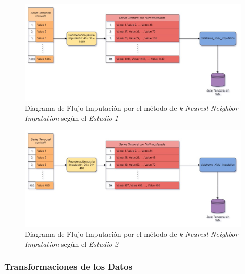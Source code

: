 \newpage
\thispagestyle{empty}
\begin{landscape}
    \begin{figure}[H]
        \centering
        \includegraphics[scale = 0.5]{./img/knn-diagram-e1.jpg}
        \caption{Diagrama de Flujo Imputación por el método de \textit{k-Nearest Neighbor Imputation} según el \textit{Estudio 1}}
        \label{fig:knn-diagram-e1}
    \end{figure}
    \begin{figure}[H]
        \centering
        \includegraphics[scale = 0.5]{./img/knn-diagram-e2.jpg}
        \caption{Diagrama de Flujo Imputación por el método de \textit{k-Nearest Neighbor Imputation} según el \textit{Estudio 2}}
        \label{fig:knn-diagram-e2}
    \end{figure}
\end{landscape}
\restoregeometry 

\subsubsection{Transformaciones de los Datos}\label{sec:transformaciones-de-datos}



 






